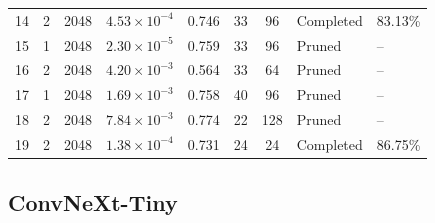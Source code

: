 {\begin{longtable}{lccccccll}
14 & 2 & 2048 & $4.53\times10^{-4}$ & 0.746 & 33 & 96 & Completed & 83.13\% \\
15 & 1 & 2048 & $2.30\times10^{-5}$ & 0.759 & 33 & 96 & Pruned & -- \\
16 & 2 & 2048 & $4.20\times10^{-3}$ & 0.564 & 33 & 64 & Pruned & -- \\
17 & 1 & 2048 & $1.69\times10^{-3}$ & 0.758 & 40 & 96 & Pruned & -- \\
18 & 2 & 2048 & $7.84\times10^{-3}$ & 0.774 & 22 & 128 & Pruned & -- \\
\rowcolor{gray!15} 19 & 2 & 2048 & $1.38\times10^{-4}$ & 0.731 & 24 & 24 & Completed & 86.75\% \\
\end{longtable}
}

\Needspace*{0.6\textheight}
\subsection{ConvNeXt-Tiny}

